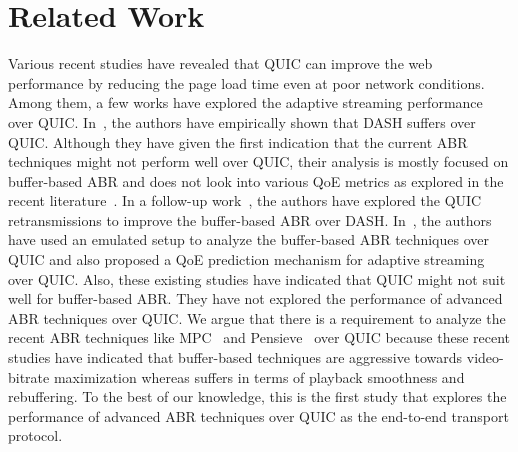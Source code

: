 \section{Related Work}
Various recent studies \cite{Biswal2017,Megyesi2016} have revealed that QUIC can improve the web performance by reducing the page load time even at poor network conditions. Among them, a few works have explored the adaptive streaming performance over QUIC. In~\cite{bhat2017not}, the authors have empirically shown that DASH suffers over QUIC. Although they have given the first indication that the current ABR techniques might not perform well over QUIC, their analysis is mostly focused on buffer-based ABR and does not look into various QoE metrics as explored in the recent literature~\cite{yin2015control,mao2017neural}. In a follow-up work~\cite{bhat2018improving}, the authors have explored the QUIC retransmissions to improve the buffer-based ABR over DASH. In~\cite{van2018empirical}, the authors have used an emulated setup to analyze the buffer-based ABR techniques over QUIC and also proposed a QoE prediction mechanism for adaptive streaming over QUIC. Also, these existing studies have indicated that QUIC might not suit well for buffer-based ABR. They have not explored the performance of advanced ABR techniques over QUIC. We argue that there is a requirement to analyze the recent ABR techniques like MPC~\cite{yin2015control} and Pensieve~\cite{mao2017neural} over QUIC because these recent studies have indicated that buffer-based techniques are aggressive towards video-bitrate maximization whereas suffers in terms of playback smoothness and rebuffering. To the best of our knowledge, this is the first study that explores the performance of advanced ABR techniques over QUIC as the end-to-end transport protocol.